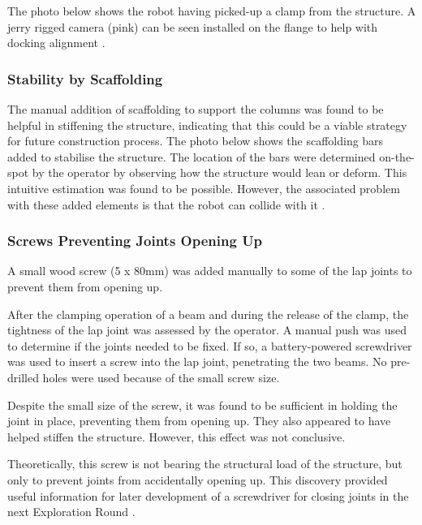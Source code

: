 The photo below shows the robot having picked-up a clamp from the structure. A jerry rigged camera (pink) can be seen installed on the flange to help with docking alignment . 




\subsubsection{Stability by Scaffolding}
\label{subsubsection:exploration-3-stability-by-scaffolding}

The manual addition of scaffolding to support the columns was found to be helpful in stiffening the structure, indicating that this could be a viable strategy for future construction process. The photo below shows the scaffolding bars added to stabilise the structure. The location of the bars were determined on-the-spot by the operator by observing how the structure would lean or deform. This intuitive estimation was found to be possible. However, the associated problem with these added elements is that the robot can collide with it .




\subsubsection{Screws Preventing Joints Opening Up}
\label{subsubsection:exploration-3-screws-preventing-joints-opening-up}

A small wood screw (5 x 80mm) was added manually to some of the lap joints to prevent them from opening up. 

After the clamping operation of a beam and during the release of the clamp, the tightness of the lap joint was assessed by the operator. A manual push was used to determine if the joints needed to be fixed. If so, a battery-powered screwdriver was used to insert a screw into the lap joint, penetrating the two beams. No pre-drilled holes were used because of the small screw size. 

Despite the small size of the screw, it was found to be sufficient in holding the joint in place, preventing them from opening up. They also appeared to have helped stiffen the structure. However, this effect was not conclusive.

Theoretically, this screw is not bearing the structural load of the structure, but only to prevent joints from accidentally opening up. This discovery provided useful information for later development of a screwdriver for closing joints in the next Exploration Round . 


